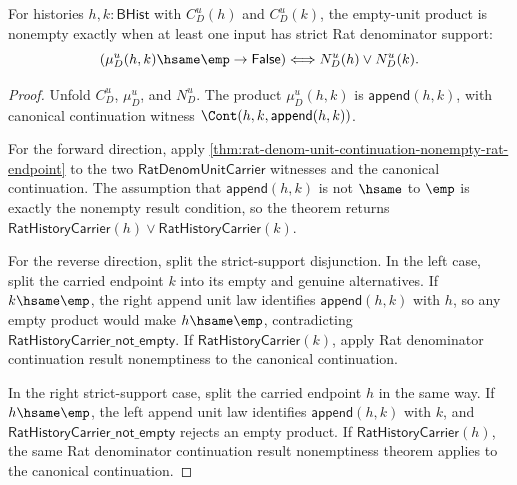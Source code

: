 \begin{theorem}
\label{thm:field-rat-denominator-empty-unit-product-nonempty-iff}
For histories $h,k:\mathsf{BHist}$ with $C_D^u(h)$ and $C_D^u(k)$, the
empty-unit product is nonempty exactly when at least one input has strict Rat
denominator support:
$$
(\mu_D^u(h,k)\hsame\emp\to\mathsf{False})
\Longleftrightarrow
N_D^u(h)\lor N_D^u(k).
$$
\end{theorem}
\begin{proof}
Unfold $C_D^u$, $\mu_D^u$, and $N_D^u$. The product
$\mu_D^u(h,k)$ is $\mathsf{append}(h,k)$, with canonical continuation witness
$\Cont(h,k,\mathsf{append}(h,k))$.

For the forward direction, apply
\autoref{thm:rat-denom-unit-continuation-nonempty-rat-endpoint} to the two
$\mathsf{RatDenomUnitCarrier}$ witnesses and the canonical continuation. The
assumption that $\mathsf{append}(h,k)$ is not $\hsame$ to $\emp$ is exactly the
nonempty result condition, so the theorem returns
$\mathsf{RatHistoryCarrier}(h)\lor\mathsf{RatHistoryCarrier}(k)$.

For the reverse direction, split the strict-support disjunction. In the left
case, split the carried endpoint $k$ into its empty and genuine alternatives.
If $k\hsame\emp$, the right append unit law identifies
$\mathsf{append}(h,k)$ with $h$, so any empty product would make $h\hsame\emp$,
contradicting $\mathsf{RatHistoryCarrier\_not\_empty}$. If
$\mathsf{RatHistoryCarrier}(k)$, apply Rat denominator continuation result
nonemptiness to the canonical continuation.

In the right strict-support case, split the carried endpoint $h$ in the same
way. If $h\hsame\emp$, the left append unit law identifies
$\mathsf{append}(h,k)$ with $k$, and
$\mathsf{RatHistoryCarrier\_not\_empty}$ rejects an empty product. If
$\mathsf{RatHistoryCarrier}(h)$, the same Rat denominator continuation result
nonemptiness theorem applies to the canonical continuation.
\end{proof}

